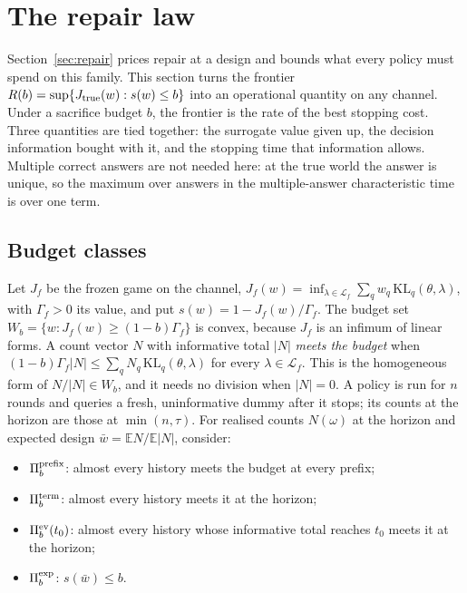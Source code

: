 
\section{The repair law}
\label{sec:repairlaw}

Section~\ref{sec:repair} prices repair at a design and bounds what every policy must spend on
this family. This section turns the frontier $R(b)=\sup\{J_{\rm true}(w):s(w)\le b\}$ into an
operational quantity on any channel. Under a sacrifice budget $b$, the frontier is the rate
of the best stopping cost. Three quantities are tied together: the surrogate value given up,
the decision information bought with it, and the stopping time that information allows.
Multiple correct answers are not needed here: at the true world the answer is unique, so the
maximum over answers in the multiple-answer characteristic time~\cite{degenne2019} is over one
term.

\subsection{Budget classes}
Let $J_f$ be the frozen game on the channel,
$J_f(w)=\inf_{\lambda\in\mathcal L_f}\sum_qw_q\,\mathrm{KL}_q(\theta,\lambda)$, with
$\Gamma_f>0$ its value, and put $s(w)=1-J_f(w)/\Gamma_f$. The budget set
$W_b=\{w:J_f(w)\ge(1-b)\Gamma_f\}$ is convex, because $J_f$ is an infimum of linear forms.
A count vector $N$ with informative total $|N|$ \emph{meets the budget} when
$(1-b)\Gamma_f|N|\le\sum_qN_q\,\mathrm{KL}_q(\theta,\lambda)$ for every
$\lambda\in\mathcal L_f$. This is the homogeneous form of $N/|N|\in W_b$, and it needs no
division when $|N|=0$. A policy is run for $n$ rounds and queries a fresh, uninformative dummy
after it stops; its counts at the horizon are those at $\min(n,\tau)$. For realised counts
$N(\omega)$ at the horizon and expected design $\bar w=\mathbb EN/\mathbb E|N|$, consider:
\begin{itemize}
\item $\Pi_b^{\rm prefix}$: almost every history meets the budget at every prefix;
\item $\Pi_b^{\rm term}$: almost every history meets it at the horizon;
\item $\Pi_b^{\rm ev}(t_0)$: almost every history whose informative total reaches $t_0$ meets it
at the horizon;
\item $\Pi_b^{\rm exp}$: $s(\bar w)\le b$.
\end{itemize}

